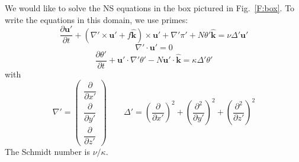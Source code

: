 \documentclass[12pt]{article}
\newcommand{\khat}{\hat{\mathbf k}}
\newcommand{\up}{\mathbf u'}
\newcommand{\grad}{\nabla}
\newcommand{\curlp}{\gradp \times}
\newcommand{\gradp}{\nabla'}
\begin{document}
We would like to solve the NS equations in the box pictured in
Fig.~\ref{F:box}.  To write the equations in this domain, we use
primes:
\[
\frac{ \partial  \up }{\partial t}  + (\curlp \up + f \khat) \times \up + 
\gradp \pi' + N \theta' \khat = \nu \Delta' \up
\]
\[
\gradp \cdot \up = 0
\]
\[
\frac{ \partial  \theta' }{\partial t}  + \up \cdot \grad' \theta' - 
N \up \cdot \khat = \kappa \Delta' \theta'
\]
with
\[
\gradp = 
\begin{pmatrix} \dfrac{\partial}{\partial x'} \\[5mm]
                \dfrac{\partial}{\partial y'} \\[5mm]
                \dfrac{\partial}{\partial z'} 
\end{pmatrix}
 \qquad
\Delta'  = \left(\frac{\partial}{\partial x'}\right)^2 + 
           \left(\frac{\partial^2}{\partial y'}\right)^2 +
           \left(\frac{\partial^2}{\partial z'}\right)^2 
\]
The Schmidt number is $\nu / \kappa$.  
\end{document}
